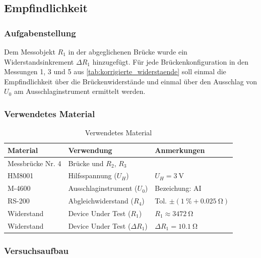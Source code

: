 \newpage
\subsection{Empfindlichkeit}\label{sec:1-3}
\subsubsection{Aufgabenstellung}

Dem Messobjekt $R_1$ in der abgeglichenen Brücke wurde ein Widerstandsinkrement $\Delta R_1$ hinzugefügt. Für jede Brückenkonfiguration in den Messungen 1, 3 und 5 aus \autoref{tab:korrigierte_widerstaende} soll einmal die Empfindlichkeit über die Brückenwiderstände und einmal über den Ausschlag von $U_0$ am Ausschlaginstrument ermittelt werden.

\subsubsection{Verwendetes Material}

\begin{table}[h]
	\centering
	\caption{Verwendetes Material}
	\begin{tabularx}{\textwidth}{XXX}
		\textbf{Material} & \textbf{Verwendung}              & \textbf{Anmerkungen}                             \\ \midrule
		Messbrücke Nr. 4  & Brücke und $R_2$, $R_3$          &                                                  \\
		HM8001            & Hilfsspannung ($U_H$)            & $U_H=\SI{3}{\volt}$                              \\
		M-4600            & Ausschlaginstrument ($U_0$)      & Bezeichung: AI                                   \\
		RS-200            & Abgleichwiderstand ($R_4$)       & Tol. $\pm (\SI{1}{\percent} + \SI{0.025}{\ohm})$ \\
		Widerstand        & Device Under Test ($R_1$)        & $R_1 \approx \SI{3472}{\ohm}$                    \\
		Widerstand        & Device Under Test ($\Delta R_1$) & $\Delta R_1 = \SI{10.1}{\ohm}$                   \\
	\end{tabularx}
\end{table}

\subsubsection{Versuchsaufbau}

